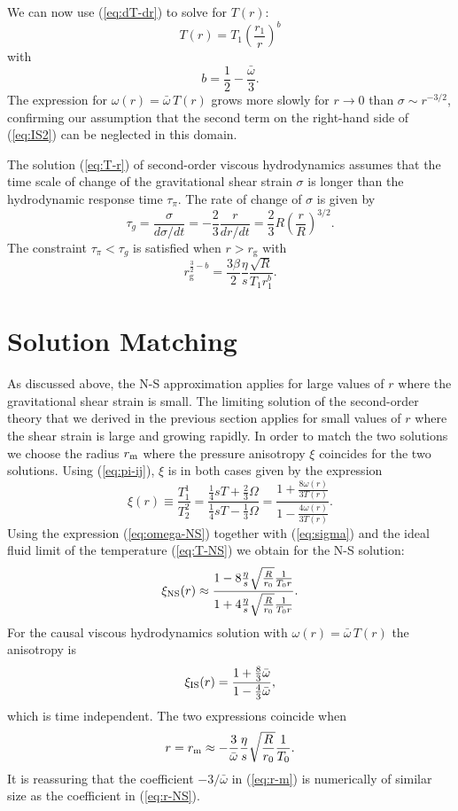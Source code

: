 \documentclass[article,twocolumn]{revtex4}
\newcommand{\be}{\begin{equation}}
\newcommand{\ee}{\end{equation}}
\begin{document}
We can now use (\ref{eq:dT-dr}) to solve for $T(r)$:
\be
T(r) = T_1 \left( \frac{r_1}{r} \right)^b 
\label{eq:T-r}
\ee
with
\be
b = \frac{1}{2} - \frac{\bar\omega}{3} .
\ee
The expression for $\omega(r) = \bar\omega\, T(r)$ grows more slowly for $r \to 0$ than $\sigma \sim r^{-3/2}$, confirming our assumption that the second term on the right-hand side of (\ref{eq:IS2}) can be neglected in this domain. 

The solution (\ref{eq:T-r}) of second-order viscous hydrodynamics assumes that the time scale of change of the gravitational shear strain $\sigma$ is longer than the hydrodynamic response time $\tau_\pi$. The rate of change of $\sigma$ is given by
\be
\tau_g = \frac{\sigma}{d\sigma/dt} = - \frac{2}{3} \frac{r}{dr/dt} = \frac{2}{3} R \left( \frac{r}{R} \right)^{3/2} .
\label{eq:tau-g}
\ee
The constraint $\tau_\pi < \tau_g$ is satisfied when $r > r_\mathrm{g}$ with
\be
r_\mathrm{g}^{\frac{3}{2}-b} = \frac{3\beta}{2} \frac{\eta}{s} \frac{\sqrt{R}}{T_1 r_1^b} .
\label{eq:r-g}
\ee


\section{Solution Matching}

As discussed above, the N-S approximation applies for large values of $r$ where the gravitational shear strain is small. The limiting solution of the second-order theory that we derived in the previous section applies for small values of $r$ where the shear strain is large and growing rapidly. In order to match the two solutions we choose the radius $r_{\rm m}$ where the pressure anisotropy $\xi$ coincides for the two solutions. Using (\ref{eq:pi-ij}), $\xi$ is in both cases given by the expression
\be 
\xi(r) \equiv \frac{T_1^1}{T_2^2}
= \frac{\frac{1}{4}sT + \frac{2}{3}\Omega}{\frac{1}{4}sT - \frac{1}{3}\Omega}
= \frac{1+\frac{8\omega(r)}{3T(r)}}{1-\frac{4\omega(r)}{3T(r)}} .
\ee
Using the expression (\ref{eq:omega-NS}) together with (\ref{eq:sigma}) and the ideal fluid limit of the temperature (\ref{eq:T-NS}) we obtain for the N-S solution:
\be
\xi_{\rm NS}(r) \approx \frac{1-8\frac{\eta}{s}\sqrt{\frac{R}{r_0}}\frac{1}{T_0r}}{1+4\frac{\eta}{s}\sqrt{\frac{R}{r_0}}\frac{1}{T_0r}} . 
\ee
For the causal viscous hydrodynamics solution with $\omega(r) = \bar\omega\, T(r)$ the anisotropy is
\be
\xi_{\rm IS}(r) = \frac{1+\frac{8}{3}\bar\omega}{1-\frac{4}{3}\bar\omega} ,
\ee
which is time independent. The two expressions coincide when 
\be
r = r_{\rm m} \approx -\frac{3}{\bar\omega} \frac{\eta}{s}\sqrt{\frac{R}{r_0}}\frac{1}{T_0} .
\label{eq:r-m}
\ee
It is reassuring that the coefficient $-3/\bar\omega$ in (\ref{eq:r-m}) is numerically of similar size as the coefficient in (\ref{eq:r-NS}). 
\end{document}
